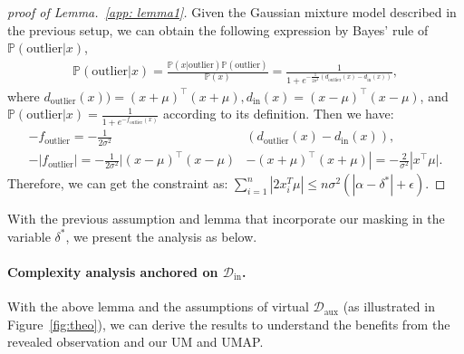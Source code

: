 \documentclass{article}
\theoremstyle{plain}
\theoremstyle{definition}
\theoremstyle{remark}
\begin{document}
\begin{proof}[proof of Lemma.~\ref{app: lemma1}]
Given the Gaussian mixture model described in the previous setup, we can obtain the following expression by Bayes' rule of $\mathbb{P}(\text{outlier}|x)$,
\begin{align}
    \mathbb{P}(\text{outlier}|x) = \frac{ \mathbb{P}(x|\text{outlier}) \mathbb{P}(\text{outlier})}{ \mathbb{P}(x)} = \frac{1}{1+e^{-\frac{1}{2\sigma^2}(d_\text{outlier}(x)-d_\text{in}(x))}},
\end{align}
where $d_\text{outlier}(x))=(x+\mu)^\top(x+\mu), d_\text{in}(x)=(x-\mu)^\top(x-\mu)$, and $\mathbb{P}(\text{outlier}|x)=\frac{1}{1+e^{-f_\text{outlier}(x)}}$ according to its definition. Then we have:
\begin{align}
    -f_\text{outlier} = -\frac{1}{2\sigma^2}&(d_\text{outlier}(x)-d_\text{in}(x)),\\
    -|f_\text{outlier}| = -\frac{1}{2\sigma^2}|(x-\mu)^\top(x-\mu)&-(x+\mu)^\top(x+\mu)|=-\frac{2}{\sigma^2}|x^\top \mu|.
\end{align}
Therefore, we can get the constraint as: $\sum_{i=1}^n|2x_i^T\mu|\leq n \sigma^2 (|\alpha-\delta^*|+\epsilon)$.
\end{proof}


With the previous assumption and lemma that incorporate our masking in the variable $\delta^*$, we present the analysis as below.

\paragraph{Complexity analysis anchored on $\mathcal{D}_\text{in}$.} With the above lemma and the assumptions of virtual $\mathcal{D}_\text{aux}$ (as illustrated in Figure~\ref{fig:theo}), we can derive the results to understand the benefits from the revealed observation and our UM and UMAP.
\end{document}

